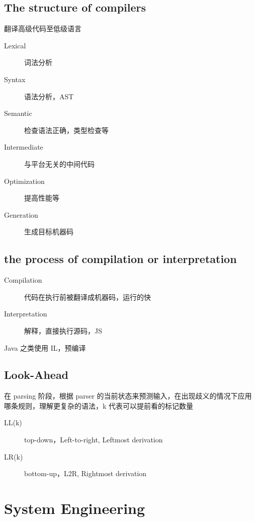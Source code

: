 \documentclass[11pt,journal,compsoc]{IEEEtran}
\begin{document}
\subsection{The structure of compilers}

翻译高级代码至低级语言

\begin{description}
    \item[Lexical] 词法分析
    \item[Syntax] 语法分析，AST
    \item[Semantic] 检查语法正确，类型检查等
    \item[Intermediate] 与平台无关的中间代码
    \item[Optimization] 提高性能等
    \item[Generation] 生成目标机器码
\end{description}


\subsection{the process of compilation or interpretation}

\begin{description}
    \item[Compilation] 代码在执行前被翻译成机器码，运行的快

    \item[Interpretation] 解释，直接执行源码，JS
\end{description}

Java 之类使用 IL，预编译


\subsection{Look-Ahead}

在 parsing 阶段，根据 parser 的当前状态来预测输入，在出现歧义的情况下应用哪条规则，理解更复杂的语法，k 代表可以提前看的标记数量

\begin{description}
    \item[LL(k)] top-down，Left-to-right, Leftmost derivation

    \item[LR(k)] bottom-up，L2R, Rightmost derivation
\end{description}


\section{System Engineering}
\end{document}
